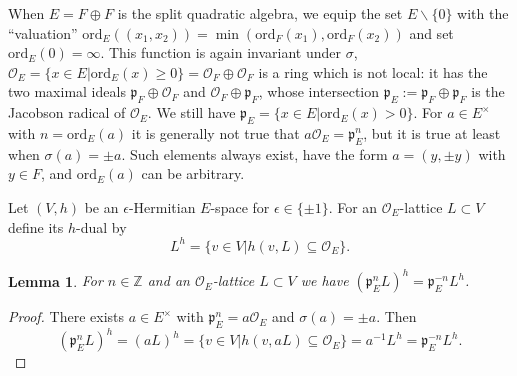 \documentclass{article}
\def\mf#1{\mathfrak{#1}}
\def\tx#1{\textrm{#1}}
\def\Z{\mathbb{Z}}
\def\sm{\smallsetminus}
\def\cO{\mathcal{O}}
\newtheorem{lem}[thm]{Lemma}
\theoremstyle{definition}
\numberwithin{equation}{subsection}
\renewcommand{\-}{\hyp{}}
\begin{document}
When $E = F \oplus F$ is the split quadratic algebra, we equip the set $E \sm \{0\}$ with the ``valuation'' $\tx{ord}_E((x_1,x_2))=\min(\tx{ord}_F(x_1),\tx{ord}_F(x_2))$ and set $\tx{ord}_E(0)=\infty$. This function is again invariant under $\sigma$, $\cO_E=\{x \in E|\tx{ord}_E(x)\geq 0\}=\cO_F \oplus \cO_F$ is a ring which is not local: it has the two maximal ideals $\mf{p}_F \oplus \cO_F$ and $\cO_F \oplus \mf{p}_F$, whose intersection $\mf{p}_E:=\mf{p}_F \oplus \mf{p}_F$ is the Jacobson radical of $\cO_E$. We still have $\mf{p}_E=\{x \in E|\tx{ord}_E(x)>0\}$. For $a \in E^\times$ with $n=\tx{ord}_E(a)$ it is generally not true that $a\cO_E = \mf{p}_E^n$, but it is true at least when $\sigma(a)=\pm a$. Such elements always exist, have the form $a=(y,\pm y)$ with $y \in F$, and $\tx{ord}_E(a)$ can be arbitrary.

Let $(V,h)$ be an $\epsilon$-Hermitian $E$-space for $\epsilon \in \{\pm1\}$. For an $\cO_E$-lattice $L \subset V$ define its $h$-dual by
\begin{equation} \label{eq:hdual}
L^h = \{v \in V|h(v,L) \subseteq \cO_E\}.
\end{equation}

\begin{lem} \label{lem:adual}
For $n \in \Z$ and an $\cO_E$-lattice $L \subset V$ we have $(\mf{p}_E^nL)^h = \mf{p}_E^{-n}L^h$.	
\end{lem}
\begin{proof}
	There exists $a \in E^\times$ with $\mf{p}_E^n=a\cO_E$ and $\sigma(a) = \pm a$. Then
	\[ (\mf{p}_E^nL)^h = (aL)^h=\{v \in V|h(v,aL) \subseteq \cO_E\} = a^{-1}L^h = \mf{p}_E^{-n}L^h. \]
\end{proof}
\end{document}
